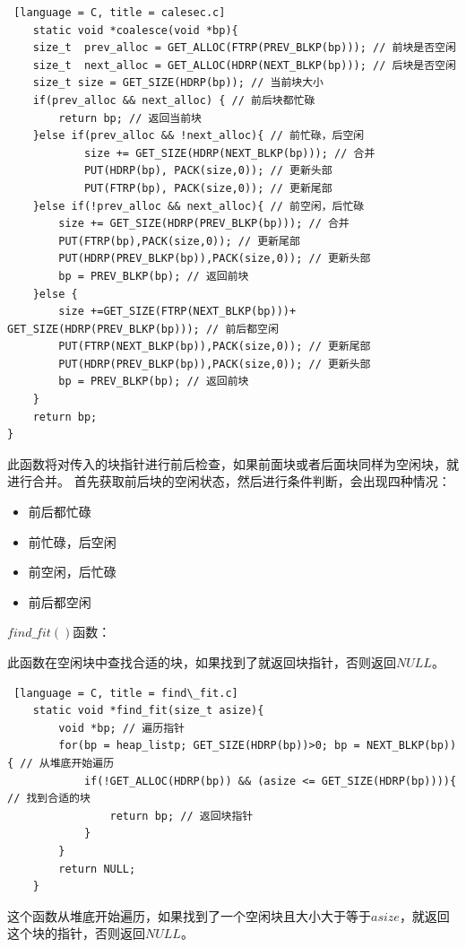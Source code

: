 \begin{lstlisting} [language = C, title = calesec.c]
    static void *coalesce(void *bp){
    size_t  prev_alloc = GET_ALLOC(FTRP(PREV_BLKP(bp))); // 前块是否空闲
    size_t  next_alloc = GET_ALLOC(HDRP(NEXT_BLKP(bp))); // 后块是否空闲
    size_t size = GET_SIZE(HDRP(bp)); // 当前块大小
    if(prev_alloc && next_alloc) { // 前后块都忙碌
        return bp; // 返回当前块
    }else if(prev_alloc && !next_alloc){ // 前忙碌，后空闲
            size += GET_SIZE(HDRP(NEXT_BLKP(bp))); // 合并
            PUT(HDRP(bp), PACK(size,0)); // 更新头部
            PUT(FTRP(bp), PACK(size,0)); // 更新尾部
    }else if(!prev_alloc && next_alloc){ // 前空闲，后忙碌
        size += GET_SIZE(HDRP(PREV_BLKP(bp))); // 合并
        PUT(FTRP(bp),PACK(size,0)); // 更新尾部
        PUT(HDRP(PREV_BLKP(bp)),PACK(size,0)); // 更新头部
        bp = PREV_BLKP(bp); // 返回前块
    }else {
        size +=GET_SIZE(FTRP(NEXT_BLKP(bp)))+ GET_SIZE(HDRP(PREV_BLKP(bp))); // 前后都空闲
        PUT(FTRP(NEXT_BLKP(bp)),PACK(size,0)); // 更新尾部
        PUT(HDRP(PREV_BLKP(bp)),PACK(size,0)); // 更新头部
        bp = PREV_BLKP(bp); // 返回前块
    }
    return bp;
}
\end{lstlisting}

此函数将对传入的块指针进行前后检查，如果前面块或者后面块同样为空闲块，就进行合并。
首先获取前后块的空闲状态，然后进行条件判断，会出现四种情况：
\begin{itemize}
    \item 前后都忙碌
    \item 前忙碌，后空闲
    \item 前空闲，后忙碌
    \item 前后都空闲
\end{itemize}

$find\_fit()$函数：

此函数在空闲块中查找合适的块，如果找到了就返回块指针，否则返回$NULL$。

\begin{lstlisting} [language = C, title = find\_fit.c]
    static void *find_fit(size_t asize){
        void *bp; // 遍历指针
        for(bp = heap_listp; GET_SIZE(HDRP(bp))>0; bp = NEXT_BLKP(bp)){ // 从堆底开始遍历
            if(!GET_ALLOC(HDRP(bp)) && (asize <= GET_SIZE(HDRP(bp)))){ // 找到合适的块
                return bp; // 返回块指针
            }
        }
        return NULL;
    }
\end{lstlisting}

这个函数从堆底开始遍历，如果找到了一个空闲块且大小大于等于$asize$，就返回这个块的指针，否则返回$NULL$。

